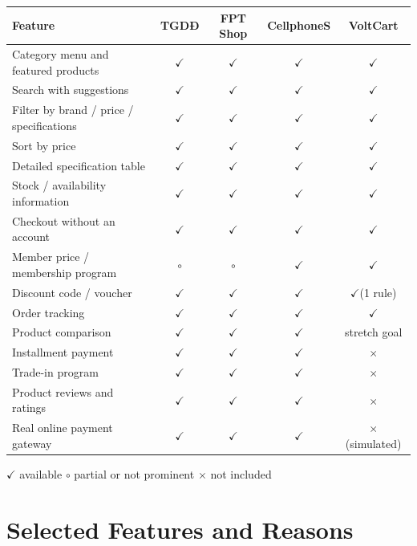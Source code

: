 \documentclass[12pt,a4paper]{article}
\newcommand{\yes}{$\checkmark$}
\newcommand{\no}{$\times$}
\newcommand{\half}{$\circ$}
\newcommand{\ProjectName}{VoltCart}
\begin{document}
\begin{center}
\begin{tabularx}{\linewidth}{|Y|c|c|c|c|}
\hline
{} \textbf{Feature} & \textbf{TGDĐ} & \textbf{FPT Shop} & \textbf{CellphoneS} & \textbf{\ProjectName} \\ \hline \endhead
Category menu and featured products        & \yes & \yes & \yes & \yes \\ \hline
Search with suggestions                    & \yes & \yes & \yes & \yes \\ \hline
Filter by brand / price / specifications   & \yes & \yes & \yes & \yes \\ \hline
Sort by price                              & \yes & \yes & \yes & \yes \\ \hline
Detailed specification table               & \yes & \yes & \yes & \yes \\ \hline
Stock / availability information           & \yes & \yes & \yes & \yes \\ \hline
Checkout without an account                & \yes & \yes & \yes & \yes \\ \hline
Member price / membership program          & \half & \half & \yes & \yes \\ \hline
Discount code / voucher                    & \yes & \yes & \yes & \yes (1 rule) \\ \hline
Order tracking                             & \yes & \yes & \yes & \yes \\ \hline
Product comparison                         & \yes & \yes & \yes & stretch goal \\ \hline
Installment payment                        & \yes & \yes & \yes & \no \\ \hline
Trade-in program                           & \yes & \yes & \yes & \no \\ \hline
Product reviews and ratings                & \yes & \yes & \yes & \no \\ \hline
Real online payment gateway                & \yes & \yes & \yes & \no{} (simulated) \\ \hline
\end{tabularx}

{\small \yes{} available \quad \half{} partial or not prominent \quad \no{} not included}
\end{center}

\section{Selected Features and Reasons}
\end{document}
